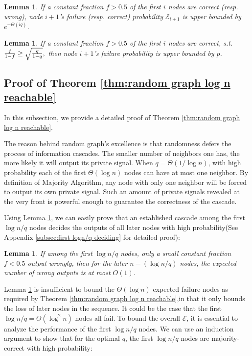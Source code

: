 \documentclass[a4paper,UKenglish]{lipics}
\newtheorem{lem}[thm]{Lemma}
\theoremstyle{definition}
\begin{document}
\begin{lem} 
\label {lem:random exponential bound}
If a constant fraction $f > 0.5$ of the first $i$ nodes are correct (resp. wrong), 
	node $i+1$'s failure (resp. correct) probability $\mathcal{E}_{i+1}$ is upper bounded by $e^{-\Theta(iq)}$. 
\end{lem}


\begin{lem}
\label {lem:random general bound}
If a constant fraction $f > 0.5$ of the first $i$ nodes are correct, s.t.
$
	{f\over 1-f} \ge \sqrt{q\over 1-q},
$
then node $i+1$'s failure probability is upper bounded by $p$. 
\end{lem}





\subsection {Proof of Theorem \ref{thm:random graph log n reachable}}

In this subsection, we provide a detailed proof of Theorem \ref{thm:random graph log n reachable}.

The reason behind random graph's excellence is that randomness defers the process of information cascades.
The smaller number of neighbors one has, the more likely it will output its private signal.
When $q = \Theta(1/ \log n)$, with high probability each of the first $\Theta(\log n)$ nodes can have at most one neighbor.
By definition of Majority Algorithm, any node with only one neighbor will be forced to output its own private signal.
Such an amount of private signals revealed at the very front is powerful enough to guarantee the correctness of the cascade.

Using Lemma \ref{lem:random exponential bound}, we can easily prove that an established cascade among the first $\log n / q$ nodes decides the outputs of all later nodes with high probability(See Appendix \ref{subsec:first logn/q deciding} for detailed proof):
\begin{lem} \label {lem:first logn/q deciding}
If among the first $\log n/q$ nodes, 
	only a small constant fraction $f < 0.5$ output wrongly, 
	then for the later $n - (\log n/q)$ nodes, the expected number of wrong outputs is at most $O(1)$.
\end{lem}

Lemma \ref{lem:first logn/q deciding} is insufficient to bound the $\Theta(\log n)$ expected failure nodes 
	as required by Theorem \ref{thm:random graph log n reachable},in that it only bounds the loss of later nodes in the sequence. 
It could be the case that the first $\log n/q = \Theta(\log^2 n)$ nodes all fail.
To bound the overall $\mathcal{E}$, it is essential to analyze the performance of the first $\log n/q$ nodes.
We can use an induction argument to show that for the optimal $q$, the first $\log n/q$ nodes are majority-correct with high probability:
\end{document}
